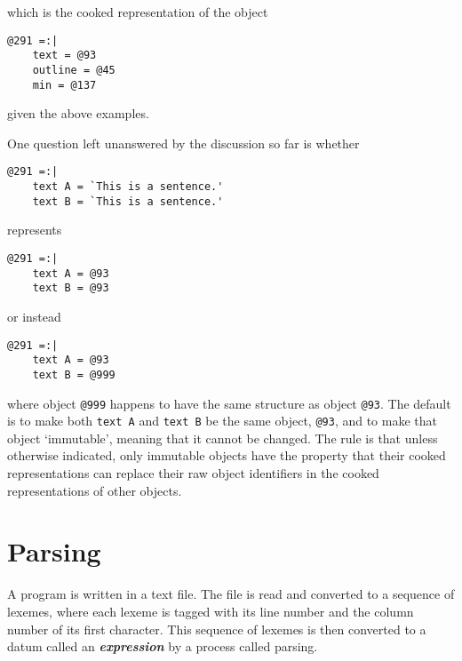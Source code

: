 \documentclass[12pt]{article}
\newcommand{\key}[1]{{\bf \em #1}\index{#1}}
\newenvironment{indpar}[1][0.3in]%
	{\begin{list}{}%
		     {\setlength{\itemsep}{0in}%
		      \setlength{\topsep}{0in}%
		      \setlength{\parsep}{1ex}%
		      \setlength{\labelwidth}{#1}%
		      \setlength{\leftmargin}{#1}%
		      \addtolength{\leftmargin}{\labelsep}}%
	 \item}%
	{\end{list}}
\begin{document}
which is the cooked representation of the object

\begin{indpar}\begin{verbatim}
@291 =:|
    text = @93
    outline = @45
    min = @137
\end{verbatim}\end{indpar}

given the above examples.

One question left unanswered by the discussion so far is whether

\begin{indpar}\begin{verbatim}
@291 =:|
    text A = `This is a sentence.'
    text B = `This is a sentence.'
\end{verbatim}\end{indpar}

represents

\begin{indpar}\begin{verbatim}
@291 =:|
    text A = @93
    text B = @93
\end{verbatim}\end{indpar}

or instead

\begin{indpar}\begin{verbatim}
@291 =:|
    text A = @93
    text B = @999
\end{verbatim}\end{indpar}

where object \verb|@999| happens to have the same structure as
object \verb|@93|.  The default is to make both \verb|text A|
and \verb|text B| be the same object, \verb|@93|, and to make
that object `immutable', meaning that it cannot be changed.  The
rule is that unless otherwise indicated, only immutable objects
have the property that their cooked representations can replace
their raw object identifiers in the cooked representations of other
objects.

\section{Parsing}
\label{PARSING}

A program is written in a text file.  The file is read and
converted to a sequence of lexemes, where each lexeme is tagged
with its line number and the column number of its first character.
This sequence of lexemes is then converted to a datum called an
\key{expression} by a process called parsing.
\end{document}
